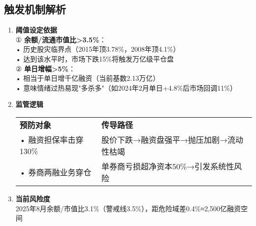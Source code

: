 \subsection{触发机制解析}
\begin{enumerate}[leftmargin=*, nosep]
    \item \textbf{阈值设定依据}  \\
    ① \textbf{余额/流通市值比>3.5\%}：\\
    • 历史股灾临界点（2015年顶3.78\%，2008年顶4.1\%）\\
    • 达到该水平时，市场下跌15\%将触发万亿级平仓盘\\
    ② \textbf{单日增幅>5\%}：\\
    • 相当于单日增千亿融资（当前基数2.13万亿）\\
    • 意味情绪过热易现{\color{red}"多杀多"}（如2024年2月单日+4.8\%后市场回调11\%）

    \item \textbf{监管逻辑}  \\
    \begin{tabular}{p{5cm}p{5cm}}
        \textbf{预防对象} & \textbf{传导路径} \\
        • 融资担保率击穿130\% & 股价下跌→融资盘强平→抛压加剧→流动性枯竭 \\
        • 券商两融业务穿仓 & 单券商亏损超净资本50\%→引发系统性风险 \\
    \end{tabular}
    
    \item \textbf{当前风险度}  \\
    2025年8月余额/市值比3.1\%（警戒线3.5\%），距危险域差0.4\%≈2,500亿融资空间
\end{enumerate}


